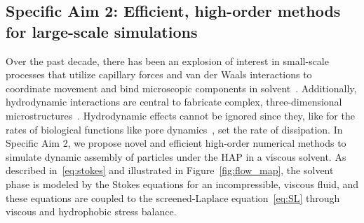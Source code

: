 \subsection{Specific Aim 2: Efficient, high-order methods for
large-scale simulations}
Over the past decade, there has been an explosion of interest in
small-scale processes that utilize capillary forces and van der Waals
interactions to coordinate movement and bind microscopic components in
solvent~\cite{Pandey2011, Zhang2017, Siontorou2017}. Additionally,
hydrodynamic interactions are central to fabricate complex,
three-dimensional microstructures~\cite{Dasgupta2017, Leong2007,
Reynolds2019, Cho2010}. Hydrodynamic effects cannot be ignored since
they, like for the rates of biological functions like pore
dynamics~\cite{RYHAM20112929}, set the rate of dissipation. In Specific
Aim 2, we propose novel and efficient high-order numerical methods to
simulate dynamic assembly of particles under the HAP in a viscous
solvent. As described in~\eqref{eq:stokes} and illustrated in
Figure~\ref{fig:flow_map}, the solvent phase is modeled by the Stokes
equations for an incompressible, viscous fluid, and these equations are
coupled to the screened-Laplace equation~\eqref{eq:SL} through viscous
and hydrophobic stress balance. 
 
